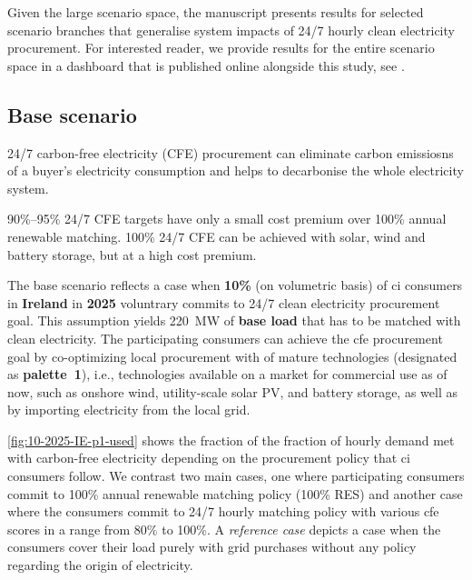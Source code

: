 Given the large scenario space, the manuscript presents results for selected scenario branches that generalise system impacts of 24/7 hourly clean electricity procurement.
For interested reader, we provide results for the entire scenario space in a dashboard that is published online alongside this study, see .

\subsection{Base scenario}
\label{subsec:base}

\vspace{10pt}
\begin{res}
    24/7 carbon-free electricity (CFE) procurement can eliminate carbon emissiosns of a buyer's electricity consumption and helps to decarbonise the whole electricity system.
\end{res}

\vspace{5pt}
\begin{res}
    90\%--95\% 24/7 CFE targets have only a small cost premium over 100\% annual renewable matching. 100\% 24/7 CFE can be achieved with solar, wind and battery storage, but at a high cost premium.
\end{res}


The base scenario reflects a case when \textbf{10\%} (on volumetric basis) of \gls{ci} consumers in \textbf{Ireland} in \textbf{2025} voluntrary commits to 24/7 clean electricity procurement goal.
This assumption yields 220~MW of \textbf{base load} that has to be matched with clean electricity. 
The participating consumers can achieve the \gls{cfe} procurement goal by co-optimizing local procurement with of mature technologies (designated as \textbf{palette~1}), i.e., technologies available on a market for commercial use as of now, such as onshore wind, utility-scale solar PV, and battery storage, as well as by importing electricity from the local grid.

\cref{fig:10-2025-IE-p1-used} shows the fraction of the fraction of hourly demand met with carbon-free electricity depending on the procurement policy that \gls{ci} consumers follow.
We contrast two main cases, one where participating consumers commit to 100\% annual renewable matching policy (100\% RES) and another case where the consumers commit to 24/7 hourly matching policy with various \gls{cfe} scores in a range from 80\% to 100\%. 
A \textit{reference case} depicts a case when the consumers cover their load purely with grid purchases without any policy regarding the origin of electricity.

